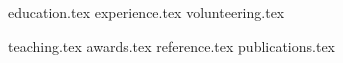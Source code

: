 \documentclass[letterpaper,10pt]{article}
\begin{document}


{education.tex}
{experience.tex}
{volunteering.tex}

{teaching.tex}
{awards.tex}
{reference.tex}
{publications.tex}
\end{document}
